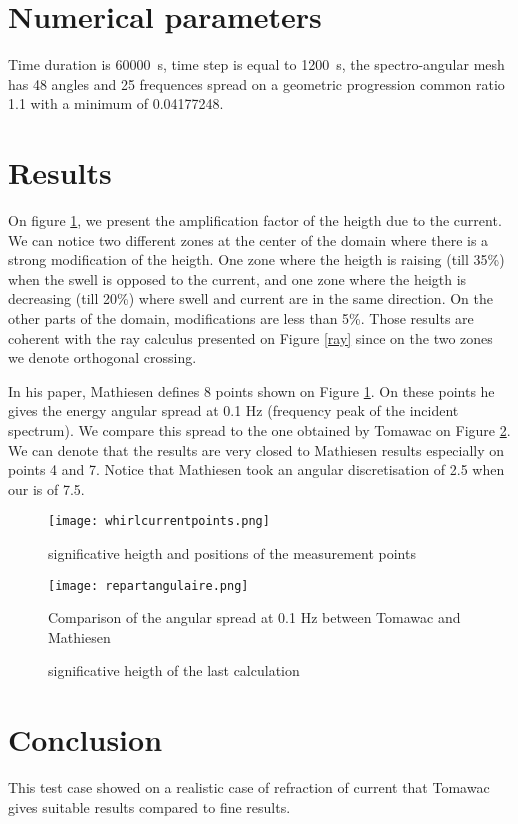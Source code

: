 %
%

\section{Numerical parameters}
%
Time duration is 60000\ s, time step is equal to 1200\ s, the spectro-angular mesh
has 48 angles and 25 frequences spread on a geometric progression common ratio
1.1 with a minimum of  0.04177248.
%
%
\section{Results}
%
On figure \ref{measurepts}, we present the amplification factor of the heigth
due to the current. We can notice two different zones at the center of the
domain where there is a strong modification of the heigth. One zone where the
heigth is raising (till 35\%) when the swell is opposed to the current, and one
zone where the heigth is decreasing (till 20\%) where swell and current are in
the same direction. On the other parts of the domain, modifications are less than
5\%. Those results are coherent with the ray calculus presented on Figure
\ref{ray} since on the two zones we denote orthogonal crossing.

In his paper, Mathiesen \cite{Mathiesen1987} defines 8 points shown on
Figure \ref{measurepts}. On these points he gives the energy angular spread at
0.1 Hz (frequency peak of the incident spectrum). We compare this spread to the
one obtained by Tomawac on Figure \ref{repartang}. We can denote that the
results are very closed to Mathiesen results especially on points 4 and 7.
Notice that Mathiesen took an angular discretisation of 2.5 when our is of 7.5.

\begin{figure} [H]
\centering
\texttt{[image: whirlcurrentpoints.png]}
 \caption{significative heigth and positions of the measurement points}
\label{measurepts}
\end{figure}


\begin{figure} [H]
\centering
\texttt{[image: repartangulaire.png]}
 \caption{Comparison of the angular spread at 0.1 Hz between Tomawac and Mathiesen}
\label{repartang}
\end{figure}

\begin{figure} [H]
\centering
{}
 \caption{significative heigth of the last calculation}
\label{resultswhirl}
\end{figure}

\section{Conclusion}
This test case showed on a realistic case of refraction of current that Tomawac
gives suitable results compared to fine results.
